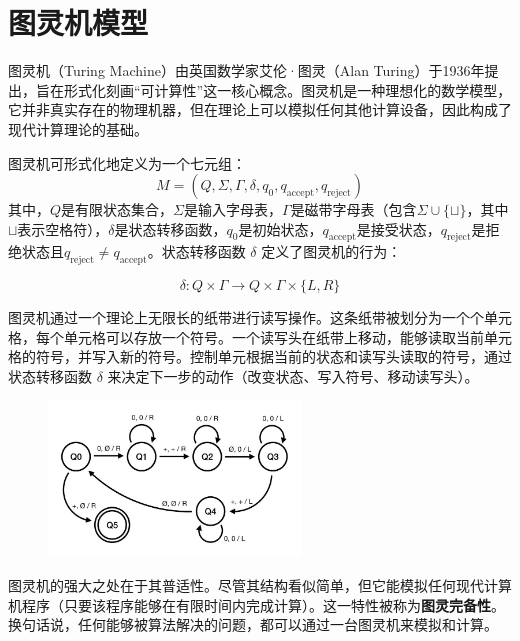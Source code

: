 \documentclass[UTF8,openany,zihao=5]{ctexbook}
\begin{document}
\section{图灵机模型}

图灵机（Turing Machine）由英国数学家艾伦·图灵（Alan Turing）于1936年提出，旨在形式化刻画“可计算性”这一核心概念。图灵机是一种理想化的数学模型，它并非真实存在的物理机器，但在理论上可以模拟任何其他计算设备，因此构成了现代计算理论的基础。

图灵机可形式化地定义为一个七元组：
$$
M = (Q, \Sigma, \Gamma, \delta, q_0, q_{\text{accept}}, q_{\text{reject}})
$$
其中，$Q$是有限状态集合，$\Sigma$是输入字母表，$\Gamma$是磁带字母表（包含$\Sigma \cup \{\sqcup\}$，其中$\sqcup$表示空格符），$\delta$是状态转移函数，$q_0$是初始状态，$q_{\text{accept}}$是接受状态，$q_{\text{reject}}$是拒绝状态且$q_{\text{reject}} \neq q_{\text{accept}}$。状态转移函数 $\delta$ 定义了图灵机的行为：

$$
\delta: Q \times \Gamma \rightarrow Q \times \Gamma \times \{L, R\}
$$

图灵机通过一个理论上无限长的纸带进行读写操作。这条纸带被划分为一个个单元格，每个单元格可以存放一个符号。一个读写头在纸带上移动，能够读取当前单元格的符号，并写入新的符号。控制单元根据当前的状态和读写头读取的符号，通过状态转移函数 $\delta$ 来决定下一步的动作（改变状态、写入符号、移动读写头）。

\begin{figure}[h]
  \begin{center}
    \includegraphics[width=0.6\textwidth]{images/turing.jpg}
    \centering
  \end{center}
  \vspace{-3ex}
\end{figure}

图灵机的强大之处在于其普适性。尽管其结构看似简单，但它能模拟任何现代计算机程序（只要该程序能够在有限时间内完成计算）。这一特性被称为\textbf{图灵完备性}。换句话说，任何能够被算法解决的问题，都可以通过一台图灵机来模拟和计算。
\end{document}
